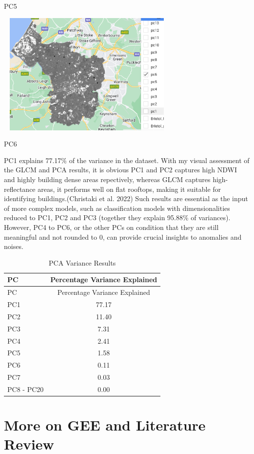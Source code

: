 \documentclass[
  letterpaper,
  DIV=11,
  numbers=noendperiod]{scrreprt}
\begin{document}
PC5

\includegraphics[width=3.54167in,height=2.39583in]{images/wk6/PC6.png}

PC6

PC1 explains 77.17\% of the variance in the dataset. With my visual
assessment of the GLCM and PCA results, it is obvious PC1 and PC2
captures high NDWI and highly building dense areas repectively, whereas
GLCM captures high-reflectance areas, it performs well on flat rooftops,
making it suitable for identifying buildings.(Christaki et al. 2022)
Such results are essential as the input of more complex models, such as
classification models with dimensionalities reduced to PC1, PC2 and PC3
(together they explain 95.88\% of variances). However, PC4 to PC6, or
the other PCs on condition that they are still meaningful and not
rounded to 0, can provide crucial insights to anomalies and noises.

\begin{longtable}[]{@{}lc@{}}
\caption{PCA Variance Results}\tabularnewline
\toprule\noalign{}
PC & Percentage Variance Explained \\
\midrule\noalign{}
\endfirsthead
\toprule\noalign{}
PC & Percentage Variance Explained \\
\midrule\noalign{}
\endhead
\bottomrule\noalign{}
\endlastfoot
PC1 & 77.17 \\
PC2 & 11.40 \\
PC3 & 7.31 \\
PC4 & 2.41 \\
PC5 & 1.58 \\
PC6 & 0.11 \\
PC7 & 0.03 \\
PC8 - PC20 & 0.00 \\
\end{longtable}

\hypertarget{more-on-gee-and-literature-review}{%
\section*{More on GEE and Literature
Review}\label{more-on-gee-and-literature-review}}
\end{document}

